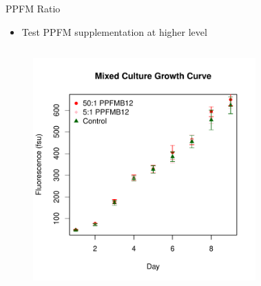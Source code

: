 \documentclass[8pt]{beamer}\usepackage[]{graphicx}\usepackage[]{color}
\begin{document}
\begin{frame}{PPFM Ratio}
\begin{itemize}
\item Test PPFM supplementation at higher level
\end{itemize}

\begin{columns}[t] %
                \begin{figure}
                                \includegraphics[width=1\textwidth]{./figure/ExpO_GrowthCurve1_unlabeled}
                                \end{figure}
                                \begin{figure}

\end{figure}
\end{columns}
\end{frame}
\end{document}
